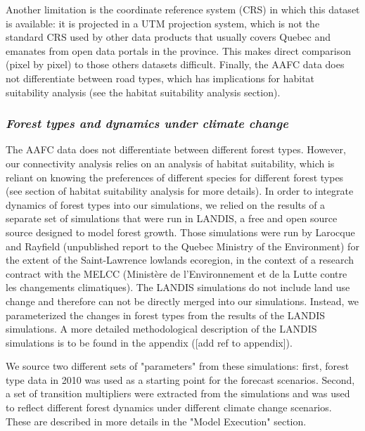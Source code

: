 Another limitation is the coordinate reference system (CRS) in which this dataset is available: it is projected in a UTM projection system, which is not the standard CRS used by other data products that usually covers Quebec and emanates from open data portals in the province. This makes direct comparison (pixel by pixel) to those others datasets difficult. Finally, the AAFC data does not differentiate between road types, which has implications for habitat suitability analysis (see the habitat suitability analysis section).\\

\subsubsection*{\textit{Forest types and dynamics under climate change}}

The AAFC data does not differentiate between different forest types. However, our connectivity analysis relies on an analysis of habitat suitability, which is reliant on knowing the preferences of different species for different forest types (see section of habitat suitability analysis for more details). In order to integrate dynamics of forest types into our simulations, we relied on the results of a separate set of simulations that were run in LANDIS, a free and open source source designed to model forest growth. Those simulations were run by Larocque and Rayfield (unpublished report to the Quebec Ministry of the Environment) for the extent of the Saint-Lawrence lowlands ecoregion, in the context of a research contract with the MELCC (Ministère de l'Environnement et de la Lutte contre les changements climatiques). The LANDIS simulations do not include land use change and therefore can not be directly merged into our simulations. Instead, we parameterized the changes in forest types from the results of the LANDIS simulations. A more detailed methodological description of the LANDIS simulations is to be found in the appendix ([add ref to appendix]). %

We source two different sets of "parameters" from these simulations: first, forest type data in 2010 was used as a starting point for the forecast scenarios. Second, a set of transition multipliers were extracted from the simulations and was used to reflect different forest dynamics under different climate change scenarios. These are described in more details in the "Model Execution" section.\\

